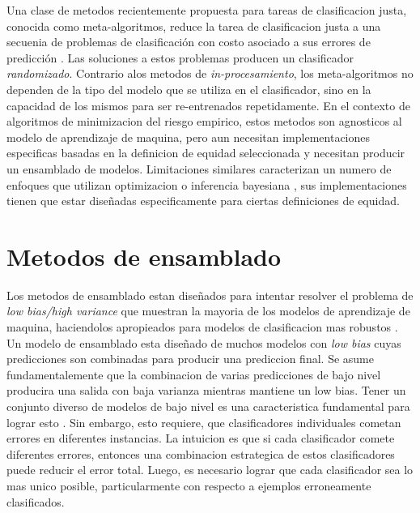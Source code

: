 Una clase de metodos recientemente propuesta para tareas de clasificacion justa, conocida como meta-algoritmos, reduce la tarea de clasificacion justa a una secuenia de problemas de clasificación con costo asociado a sus errores de predicción \parencite{agarwal2018reductions, agarwal2019fair, kearns2018preventing}. Las soluciones a estos problemas producen un clasificador \textit{randomizado}. Contrario alos metodos de \textit{in-procesamiento}, los meta-algoritmos no dependen de la tipo del modelo que se utiliza en el clasificador, sino en la capacidad de los mismos para ser re-entrenados repetidamente. En el contexto de algoritmos de minimizacion del riesgo empirico, estos metodos son agnosticos al modelo de aprendizaje de maquina, pero aun necesitan implementaciones especificas basadas en la definicion de equidad seleccionada y necesitan producir un ensamblado de modelos. Limitaciones similares caracterizan un numero de enfoques que utilizan optimizacion \parencite{chiappa2018causal,Dimitrakakis_Liu_Parkes_Radanovic_2019} o inferencia bayesiana \parencite{kearns2018preventing,thomas2019preventing}, sus implementaciones tienen que estar diseñadas especificamente para ciertas definiciones de equidad.


\section{Metodos de ensamblado}\label{section:ensembles}

Los metodos de ensamblado estan diseñados para intentar resolver el problema de \textit{low bias/high variance} que muestran la mayoria de los modelos de aprendizaje de maquina, haciendolos apropieados para modelos de clasificacion mas robustos \parencite{polikar2006ensemble}. Un modelo de ensamblado esta diseñado de muchos modelos con \textit{low bias} cuyas predicciones son combinadas para producir una prediccion final. Se asume fundamentalemente que la combinacion de varias predicciones de bajo nivel producira una salida con baja varianza mientras mantiene un low bias. Tener un conjunto diverso de modelos de bajo nivel es una caracteristica fundamental para lograr esto \parencite{polikar2006ensemble}. Sin embargo, esto requiere, que clasificadores individuales cometan errores en diferentes instancias. La intuicion es que si cada clasificador comete diferentes errores, entonces una combinacion estrategica de estos clasificadores puede reducir el error total. Luego, es necesario lograr que cada clasificador sea lo mas unico posible, particularmente con respecto a ejemplos erroneamente clasificados.

